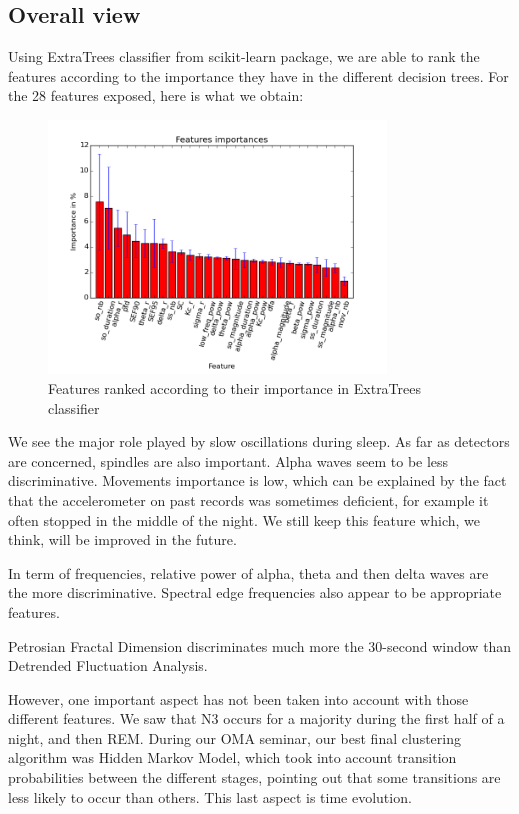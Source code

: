 \documentclass[12pt]{report}
\begin{document}
\subsection{Overall view}

Using ExtraTrees classifier from scikit-learn package, we are able to rank the features according to the importance they have in the different decision trees. For the 28 features exposed, here is what we obtain:

\begin{figure}[H]
\centering
\includegraphics[width=0.8\textwidth]{img/chap2/feat_imp_notime.png}
\caption{\label{fig:feat_imp_notime}Features ranked according to their importance in ExtraTrees classifier}
\end{figure}

We see the major role played by slow oscillations during sleep. As far as detectors are concerned, spindles are also important. Alpha waves seem to be less discriminative. Movements importance is low, which can be explained by the fact that the accelerometer on past records was sometimes deficient, for example it often stopped in the middle of the night. We still keep this feature which, we think, will be improved in the future.

In term of frequencies, relative power of alpha, theta and then delta waves are the more discriminative. Spectral edge frequencies also appear to be appropriate features.

Petrosian Fractal Dimension discriminates much more the 30-second window than Detrended Fluctuation Analysis.

However, one important aspect has not been taken into account with those different features. We saw that N3 occurs for a majority during the first half of a night, and then REM. During our OMA seminar, our best final clustering algorithm was Hidden Markov Model, which took into account transition probabilities between the different stages, pointing out that some transitions are less likely to occur than others. This last aspect is time evolution.
\end{document}
